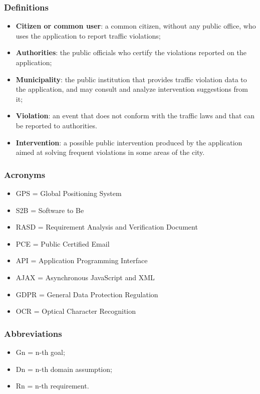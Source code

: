 \subsubsection{Definitions}
	\begin{itemize}
		\item \textbf{Citizen or common user}: a common citizen, without any public office, who uses the application to report traffic violations;
		\item \textbf{Authorities}: the public officials who certify the violations reported on the application;
		\item \textbf{Municipality}: the public institution that provides traffic violation data to the application, and may consult and analyze intervention suggestions from it;
		\item \textbf{Violation}: an event that does not conform with the traffic laws and that can be reported to authorities.
		\item \textbf{Intervention}: a possible public intervention produced by the application aimed at solving frequent violations in some areas of the city.
	\end{itemize}
\subsubsection{Acronyms}
\begin{itemize}
	\item GPS = Global Positioning System
	\item S2B = Software to Be
	\item RASD = Requirement Analysis and Verification Document
	\item PCE = Public Certified Email
	\item API = Application Programming Interface
	\item AJAX = Asynchronous JavaScript and XML
	\item GDPR = General Data Protection Regulation
	\item OCR = Optical Character Recognition
\end{itemize}
\subsubsection{Abbreviations}
\begin{itemize}
	\item Gn = n-th goal;
	\item Dn = n-th domain assumption;
	\item Rn = n-th requirement.
\end{itemize}